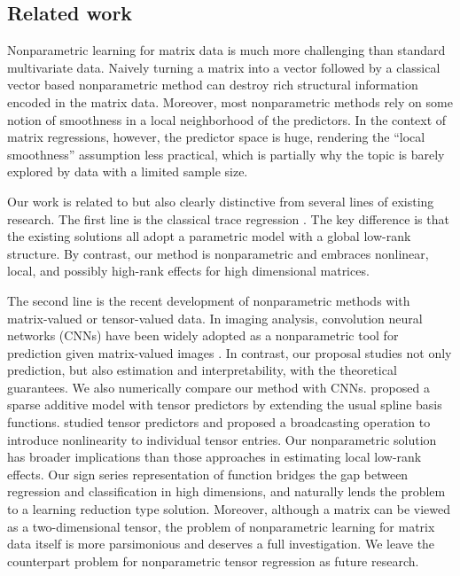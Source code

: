 \documentclass[11pt]{article}
\theoremstyle{plain}
\theoremstyle{definition}
\begin{document}
\subsection{Related work}

Nonparametric learning for matrix data is much more challenging than standard multivariate data. Naively turning a matrix into a vector followed by a classical vector based nonparametric method can destroy rich structural information encoded in the matrix data. Moreover, most nonparametric methods rely on some notion of smoothness in a local neighborhood of the predictors. In the context of matrix regressions, however, the predictor space is huge, rendering the ``local smoothness'' assumption less practical, which is partially why the topic is barely explored by data with a limited sample size.  

Our work is related to but also clearly distinctive from several lines of existing research. The first line is the classical trace regression \citep{fan2019generalized,hamidi2019low}. The key difference is that the existing solutions all adopt a parametric model with a global low-rank structure. By contrast, our method is nonparametric and embraces nonlinear, local, and possibly high-rank effects for high dimensional matrices. 
 
The second line is the recent development of nonparametric methods with matrix-valued or tensor-valued data. In imaging analysis,  convolution neural networks (CNNs) have been widely adopted as a nonparametric tool for prediction given matrix-valued images \citep{goodfellow2016deep}. In contrast, our proposal studies not only prediction, but also estimation and interpretability, with the theoretical guarantees. We also numerically compare our method with CNNs. \cite{hao2019sparse} proposed a sparse additive model with tensor predictors by extending the usual spline basis functions. \cite{zhou2020broadcasted} studied tensor predictors and proposed a broadcasting operation to introduce nonlinearity to individual tensor entries. Our nonparametric solution has broader implications than those approaches in estimating local low-rank effects. Our sign series representation of function bridges the gap between regression and classification in high dimensions, and naturally lends the problem to a learning reduction type solution. Moreover, although a matrix can be viewed as a two-dimensional tensor, the problem of nonparametric learning for matrix data itself is more parsimonious and deserves a full investigation. We leave the counterpart problem for nonparametric tensor regression as future research. 
\end{document}
